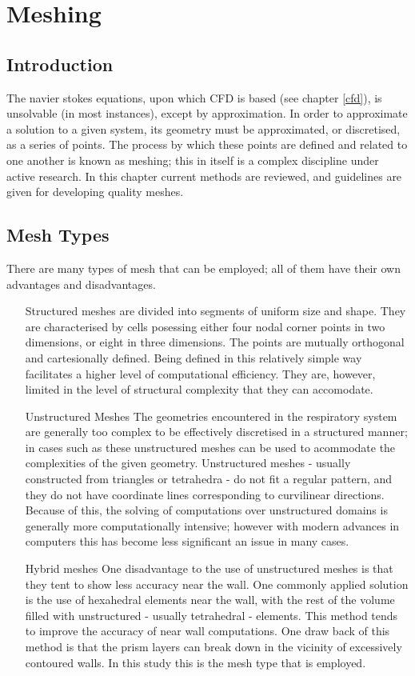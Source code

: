 \section{Meshing} \label{Meshing}
\subsection{Introduction}

The navier stokes equations, upon which CFD is based (see chapter \ref{cfd}), is unsolvable (in most instances), except by approximation. In order to approximate a solution to a given system, its geometry must be approximated, or discretised, as a series of points. The process by which these points are defined and related to one another is known as meshing; this in itself is a complex discipline under active research. In this chapter current methods are reviewed, and guidelines are given for developing quality meshes.
\subsection{Mesh Types} \label{mtypes}

There are many types of mesh that can be employed; all of them have their own advantages and disadvantages. 

\begin{itemize}
  \item[Structured meshes]
    are divided into segments of uniform size and shape. They are characterised by cells posessing either four nodal corner points in two dimensions, or eight in three dimensions. The points are mutually orthogonal and cartesionally defined. Being defined in this relatively simple way facilitates a higher level of computational efficiency. They are, however, limited in the level of structural complexity that they can accomodate.

  \item[Unstructured Meshes]
    The geometries encountered in the respiratory system are generally too complex to be effectively discretised in a structured manner; in cases such as these unstructured meshes can be used to acommodate the complexities of the given geometry. Unstructured meshes - usually constructed from triangles or tetrahedra - do not fit a regular pattern, and they do not have coordinate lines corresponding to curvilinear directions. Because of this, the solving of computations over unstructured domains is generally more computationally intensive; however with modern advances in computers this has become less significant an issue in many cases.

  \item[Hybrid meshes]
    One disadvantage to the use of unstructured meshes is that they tent to show less accuracy near the wall. One commonly applied solution is the use of hexahedral elements near the wall, with the rest of the volume filled with unstructured - usually tetrahedral - elements. This method tends to improve the accuracy of near wall computations. One draw back of this method is that the prism layers can break down in the vicinity of excessively contoured walls. In this study this is the mesh type that is employed.

\end{itemize}

